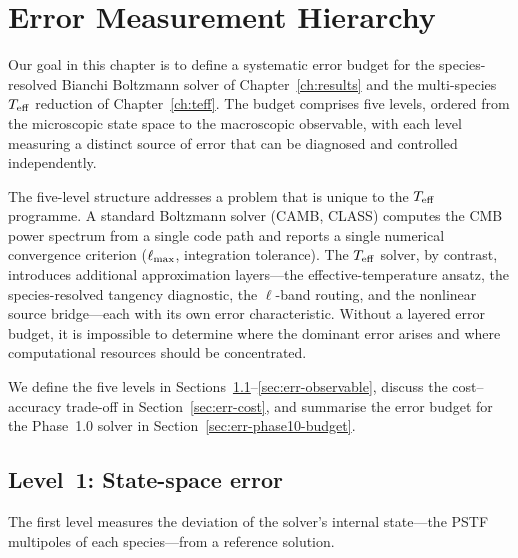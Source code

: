 
\chapter{Error Measurement Hierarchy}
\label{ch:error-hierarchy}

Our goal in this chapter is to define a systematic error
budget for the species-resolved Bianchi Boltzmann solver of
Chapter~\ref{ch:results} and the multi-species $T_{\mathrm{eff}}$
reduction of Chapter~\ref{ch:teff}.  The budget comprises five
levels, ordered from the microscopic state space to the
macroscopic observable, with each level measuring a distinct
source of error that can be diagnosed and controlled
independently.

The five-level structure addresses a problem that is unique to
the $T_{\mathrm{eff}}$ programme.  A standard Boltzmann solver (CAMB,
CLASS) computes the CMB power spectrum from a single code path
and reports a single numerical convergence criterion
($\ell_{\rm max}$, integration tolerance).  The $T_{\mathrm{eff}}$
solver, by contrast, introduces additional approximation
layers---the effective-temperature ansatz, the species-resolved
tangency diagnostic, the $\ell$-band routing, and the
nonlinear source bridge---each with its own error
characteristic.  Without a layered error budget, it is
impossible to determine where the dominant error arises and
where computational resources should be concentrated.

We define the five levels in
Sections~\ref{sec:err-state}--\ref{sec:err-observable},
discuss the cost--accuracy trade-off in
Section~\ref{sec:err-cost}, and summarise the error budget
for the Phase~1.0 solver in
Section~\ref{sec:err-phase10-budget}.


\section{Level~1: State-space error}
\label{sec:err-state}

The first level measures the deviation of the solver's
internal state---the PSTF multipoles of each species---from
a reference solution.


